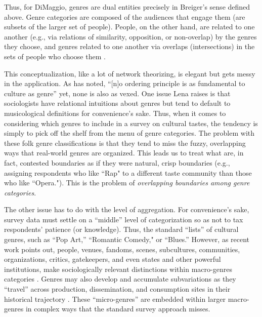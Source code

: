 \documentclass[a4paper,12pt]{extarticle}
\begin{document}
Thus, for DiMaggio, genres are dual entities precisely in Breiger's sense defined above. Genre categories are composed of the audiences that engage them (are subsets of the larger set of people). People, on the other hand, are related to one another (e.g., via relations of similarity, opposition, or non-overlap) by the genres they choose, and genres related to one another via overlaps (intersections) in the sets of people who choose them \citet{lizardo18}. 

This conceptualization, like a lot of network theorizing, is elegant but gets messy in the application. As \citet[149]{lena2015relational} has noted, ``[n]o ordering principle is as fundamental to culture as genre'' yet, none is also as vexed. One issue Lena raises is that sociologists have relational intuitions about genres but tend to default to musicological definitions for convenience's sake. Thus, when it comes to considering which genres to include in a survey on cultural tastes, the tendency is simply to pick off the shelf from the menu of genre categories. The problem with these folk genre classifications is that they tend to miss the fuzzy, overlapping ways that real-world genres are organized. This leads us to treat what are, in fact, contested boundaries as if they were natural, crisp boundaries (e.g., assigning respondents who like ``Rap" to a different taste community than those who like ``Opera."). This is the problem of \textit{overlapping boundaries among genre categories}. 

The other issue has to do with the level of aggregation. For convenience’s sake, survey data must settle on a ``middle'' level of categorization so as not to tax respondents' patience (or knowledge). Thus, the standard ``lists'' of cultural genres, such as ``Pop Art,'' ``Romantic Comedy," or ``Blues.'' However, as recent work points out, people, venues, fandoms, scenes, subcultures, communities, organizations, critics, gatekeepers, and even states and other powerful institutions, make sociologically relevant distinctions within macro-genres categories \citep{hesmondhalgh2005subcultures, Holt2007, Van_Poecke2018}. Genres may also develop and accumulate subvariations as they ``travel'' across production, dissemination, and consumption sites in their historical trajectory \citep{Lena2012}. These ``micro-genres'' are embedded within larger macro-genres in complex ways that the standard survey approach misses. 
\end{document}
